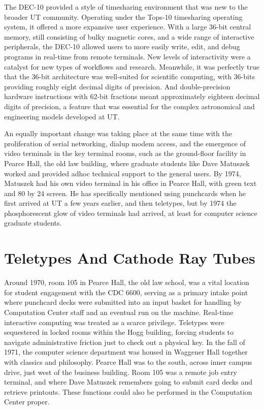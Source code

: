 The DEC-10 provided a style of timesharing environment that was new to the broader UT community. Operating under the Tops-10 timesharing operating system, it offered a more expansive user experience. With a large 36-bit central memory, still consisting of bulky magnetic cores, and a wide range of interactive peripherals, the DEC-10 allowed users to more easily write, edit, and debug programs in real-time from remote terminals. New levels of interactivity were a catalyst for new types of workflows and research. Meanwhile, it was perfectly true that the 36-bit architecture was well-suited for scientific computing, with 36-bits providing roughly eight decimal digits of precision. And double-precision hardware instructions with 62-bit fractions meant approximately eighteen decimal digits of precision, a feature that was essential for the complex astronomical and engineering models developed at UT. 

An equally important change was taking place at the same time with the proliferation of serial networking, dialup modem access, and the emergence of video terminals in the key terminal rooms, such as the ground-floor facility in Pearce Hall, the old law building, where graduate students like Dave Matuszek worked and provided adhoc technical support to the general users. By 1974, Matuszek had his own video terminal in his office in Pearce Hall, with green text and 80 by 24 screen. He has specifically mentioned using punchcards when he first arrived at UT a few years earlier, and then teletypes, but by 1974 the phosphorescent glow of video terminals had arrived, at least for computer science graduate students. \cite{matuszekDaveMatuszekOral2026}

\section{Teletypes And Cathode Ray Tubes}

Around 1970, room 105 in Pearce Hall, the old law school, was a vital location for student engagement with the CDC 6600, serving as a primary intake point where punchcard decks were submitted into an input basket for handling by Computation Center staff and an eventual run on the machine. Real-time interactive computing was treated as a scarce privilege. Teletypes were sequestered in locked rooms within the Hogg building, forcing students to navigate administrative friction just to check out a physical key. In the fall of 1971, the computer science department was housed in Waggener Hall together with classics and philosophy. Pearce Hall was to the south, across inner campus drive, just west of the business building. Room 105 was a remote job entry terminal, and where Dave Matuszek remembers going to submit card decks and retrieve printouts. These functions could also be performed in the Computation Center proper.


